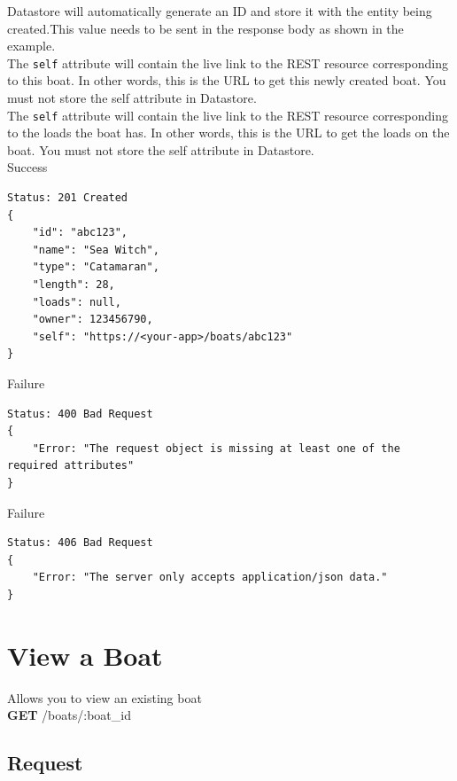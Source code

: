 \documentclass[letterpaper,11pt,titlepage,draftclsnofoot,onecolumn,compsoc,utf8,latin1]{IEEEtran}
\begin{document}
\begin{singlespace}
Datastore will automatically generate an ID and store it with the entity being created.This value needs to be sent in the response body as shown in the example.\\

\noindent The \texttt{self} attribute will contain the live link to the REST resource corresponding to this boat. In other words, this is the URL to get this newly created boat. You must not store the self attribute in Datastore.\\

\noindent The \texttt{self} attribute will contain the live link to the REST resource corresponding to the loads the boat has. In other words, this is the URL to get the loads on the boat. You must not store the self attribute in Datastore.\\

\noindent \Large{Success}

\begin{lstlisting}[]
Status: 201 Created
{
    "id": "abc123",
    "name": "Sea Witch",
    "type": "Catamaran",
    "length": 28,
    "loads": null,
    "owner": 123456790,
    "self": "https://<your-app>/boats/abc123"
}
\end{lstlisting}

\noindent \Large{Failure}

\begin{lstlisting}[]
Status: 400 Bad Request
{
    "Error: "The request object is missing at least one of the required attributes"
}
\end{lstlisting}

\noindent \Large{Failure}

\begin{lstlisting}[]
Status: 406 Bad Request
{
    "Error: "The server only accepts application/json data."
}
\end{lstlisting}

\newpage 

\normalsize

\section{View a Boat}

Allows you to view an existing boat\\

\noindent \textbf{GET} /boats/:boat\_id

\subsection{Request}


\end{singlespace}
\end{document}
